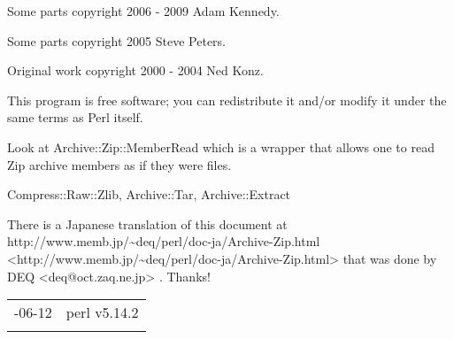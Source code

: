 \documentclass[]{article}
\begin{document}
Some parts copyright 2006 - 2009 Adam Kennedy.

Some parts copyright 2005 Steve Peters.

Original work copyright 2000 - 2004 Ned Konz.

This program is free software; you can redistribute it and/or modify it
under the same terms as Perl itself.


Look at Archive::Zip::MemberRead which is a wrapper that allows one to
read Zip archive members as if they were files.

Compress::Raw::Zlib, Archive::Tar, Archive::Extract

There is a Japanese translation of this document at
http://www.memb.jp/\textasciitilde{}deq/perl/doc-ja/Archive-Zip.html
\textless{}http://www.memb.jp/\textasciitilde{}deq/perl/doc-ja/Archive-Zip.html\textgreater{}
that was done by DEQ \textless{}deq@oct.zaq.ne.jp\textgreater{} .
Thanks!

\begin{longtable}[c]{@{}ll@{}}
\toprule\addlinespace
2013-06-12 & perl v5.14.2
\\\addlinespace
\bottomrule
\end{longtable}
\end{document}
